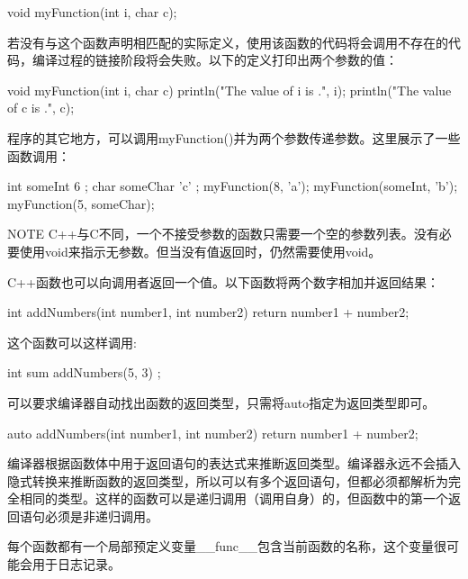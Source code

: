 \begin{cpp}
void myFunction(int i, char c);
\end{cpp}

若没有与这个函数声明相匹配的实际定义，使用该函数的代码将会调用不存在的代码，编译过程的链接阶段将会失败。以下的定义打印出两个参数的值：

\begin{cpp}
void myFunction(int i, char c)
{
    println("The value of i is {}.", i);
    println("The value of c is {}.", c);
}
\end{cpp}

程序的其它地方，可以调用myFunction()并为两个参数传递参数。这里展示了一些函数调用：

\begin{cpp}
int someInt { 6 };
char someChar { 'c' };
myFunction(8, 'a');
myFunction(someInt, 'b');
myFunction(5, someChar);
\end{cpp}

\begin{myNotic}{NOTE}
C++与C不同，一个不接受参数的函数只需要一个空的参数列表。没有必要使用void来指示无参数。但当没有值返回时，仍然需要使用void。
\end{myNotic}

C++函数也可以向调用者返回一个值。以下函数将两个数字相加并返回结果：

\begin{cpp}
int addNumbers(int number1, int number2)
{
    return number1 + number2;
}
\end{cpp}

这个函数可以这样调用:

\begin{cpp}
int sum { addNumbers(5, 3) };
\end{cpp}


可以要求编译器自动找出函数的返回类型，只需将auto指定为返回类型即可。

\begin{cpp}
auto addNumbers(int number1, int number2)
{
    return number1 + number2;
}
\end{cpp}

编译器根据函数体中用于返回语句的表达式来推断返回类型。编译器永远不会插入隐式转换来推断函数的返回类型，所以可以有多个返回语句，但都必须都解析为完全相同的类型。这样的函数可以是递归调用（调用自身）的，但函数中的第一个返回语句必须是非递归调用。


每个函数都有一个局部预定义变量\_\_func\_\_包含当前函数的名称，这个变量很可能会用于日志记录。

